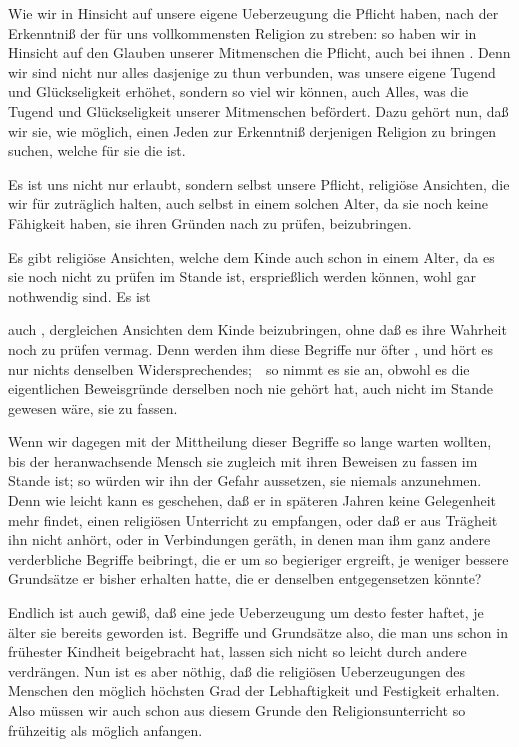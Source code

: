 Wie wir in Hinsicht auf unsere eigene Ueberzeugung die Pflicht haben, nach der Erkenntniß der für uns vollkommensten Religion zu streben: so haben wir in Hinsicht auf den Glauben unserer Mitmenschen die Pflicht, auch bei ihnen . Denn wir sind nicht nur alles dasjenige zu thun verbunden, was unsere eigene Tugend und Glückseligkeit erhöhet, sondern so viel wir können, auch Alles, was die Tugend und Glückseligkeit unserer Mitmenschen befördert. Dazu gehört nun, daß wir sie, wie möglich, einen Jeden zur Erkenntniß derjenigen Religion zu bringen suchen, welche für sie die  ist.

\begin{aufza} 
\item Es ist uns nicht nur erlaubt, sondern selbst unsere Pflicht, religiöse Ansichten, die wir für zuträglich halten,  auch selbst in einem solchen Alter, da sie noch keine Fähigkeit haben, sie ihren Gründen nach zu prüfen, beizubringen.
\begin{aufzb}
\item Es gibt religiöse Ansichten, welche dem Kinde auch schon in einem Alter, da es sie noch nicht zu prüfen im Stande ist, ersprießlich werden können, wohl gar nothwendig sind. Es ist
\item auch , dergleichen Ansichten dem Kinde beizubringen, ohne daß es ihre Wahrheit noch zu prüfen vermag. Denn werden ihm diese Begriffe nur öfter , und hört es nur nichts denselben Widersprechendes;~\ so nimmt es sie an, obwohl es die eigentlichen Beweisgründe derselben noch nie gehört hat, auch nicht im Stande gewesen wäre, sie zu fassen.
\item Wenn wir dagegen mit der Mittheilung dieser Begriffe so lange warten wollten, bis der heranwachsende Mensch sie zugleich mit ihren Beweisen zu fassen im Stande ist; so würden wir ihn der Gefahr aussetzen, sie niemals anzunehmen. Denn wie leicht kann es geschehen, daß er in späteren Jahren keine Gelegenheit mehr findet, einen religiösen Unterricht zu empfangen, oder daß er aus Trägheit ihn nicht anhört, oder in Verbindungen geräth, in denen man ihm ganz andere verderbliche Begriffe beibringt, die er um so begieriger ergreift, je weniger bessere Grundsätze er bisher erhalten hatte, die er denselben entgegensetzen könnte?
\item Endlich ist auch gewiß, daß eine jede Ueberzeugung um desto fester haftet, je älter sie bereits geworden ist. Begriffe und Grundsätze also, die man uns schon in frühester Kindheit beigebracht hat, lassen sich nicht so leicht durch andere verdrängen. Nun ist es aber nöthig, daß die religiösen Ueberzeugungen des Menschen den möglich höchsten Grad der Lebhaftigkeit und Festigkeit erhalten. Also müssen wir auch schon aus diesem Grunde den Religionsunterricht so frühzeitig als möglich anfangen.
\end{aufzb}
\end{aufza}

